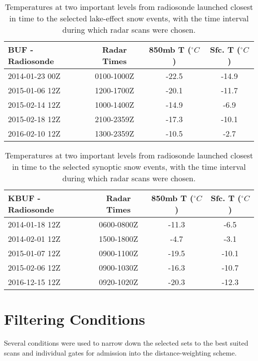 \begin{table}[H]
    \caption{Temperatures at two important levels from radiosonde launched closest in time to the selected lake-effect snow events, with the time interval during which radar scans were chosen.}\label{eventslake}
    \begin{center}
    \begin{tabular}{|l|c|c|c|}
    \hline
     BUF - Radiosonde & Radar Times & 850mb T ($^{\circ}C$) & Sfc. T ($^{\circ}C$)\\
    \hline\hline
    2014-01-23 00Z & 0100-1000Z & -22.5 & -14.9 \\
    \hline
    2015-01-06 12Z & 1200-1700Z & -20.1 & -11.7 \\
    \hline
    2015-02-14 12Z & 1000-1400Z & -14.9 & -6.9 \\
    \hline
    2015-02-18 12Z & 2100-2359Z & -17.3 & -10.1 \\
    \hline
    2016-02-10 12Z & 1300-2359Z & -10.5 & -2.7 \\
    \hline
    \end{tabular}
    \end{center}
\end{table}

\begin{table}[H]
    \caption{Temperatures at two important levels from radiosonde launched closest in time to the selected synoptic snow events, with the time interval during which radar scans were chosen.}\label{synopticevents}
    \begin{center}
    \begin{tabular}{|l|c|c|c|}
    \hline
     KBUF - Radiosonde & Radar Times & 850mb T ($^{\circ}C$) & Sfc. T ($^{\circ}C$)\\
    \hline\hline
    2014-01-18 12Z & 0600-0800Z & -11.3 & -6.5 \\
    \hline
    2014-02-01 12Z & 1500-1800Z & -4.7 & -3.1 \\
    \hline
    2015-01-07 12Z & 0900-1100Z & -19.5 & -10.1 \\
    \hline
    2015-02-06 12Z & 0900-1030Z & -16.3 & -10.7 \\
    \hline
    2016-12-15 12Z & 0920-1020Z & -20.3 & -12.3 \\
    \hline
    \end{tabular}
    \end{center}
\end{table}
\section{Filtering Conditions}
Several conditions were used to narrow down the selected sets to the best suited scans and individual gates for admission into the distance-weighting scheme.
